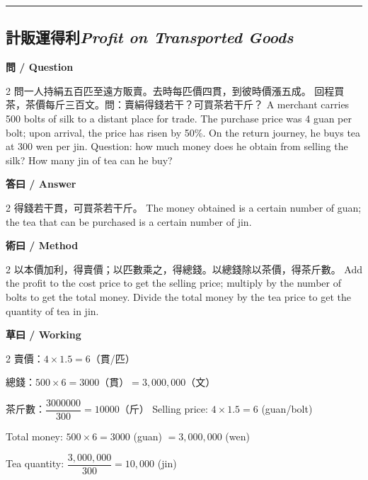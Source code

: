\documentclass[11pt,a4paper]{article}
\newcommand{\bilingualsubsection}[2]{\subsection{#1\quad\textit{#2}}}
\newcommand{\longline}{\noindent\rule{\textwidth}{0.4pt}}
\begin{document}
\vspace{0.5em}
\longline

\bilingualsubsection{計販運得利}{Profit on Transported Goods}

\vspace{0.4em}
\noindent\textbf{\textcolor{chinesecolor}{問} / \textcolor{englishcolor}{Question}}
\vspace{0.3em}
\begin{paracol}{2}
問一人持絹五百匹至遠方販賣。去時每匹價四貫，到彼時價漲五成。
回程買茶，茶價每斤三百文。問：賣絹得錢若干？可買茶若干斤？
\switchcolumn
A merchant carries 500 bolts of silk to a distant place for trade. The
purchase price was 4 guan per bolt; upon arrival, the price has risen by
50\%. On the return journey, he buys tea at 300 wen per jin. Question: how
much money does he obtain from selling the silk? How many jin of tea can he
buy?
\end{paracol}

\vspace{0.4em}
\noindent\textbf{\textcolor{chinesecolor}{答曰} / \textcolor{englishcolor}{Answer}}
\vspace{0.2em}
\begin{paracol}{2}
得錢若干貫，可買茶若干斤。
\switchcolumn
The money obtained is a certain number of guan; the tea that can be
purchased is a certain number of jin.
\end{paracol}

\vspace{0.4em}
\noindent\textbf{\textcolor{chinesecolor}{術曰} / \textcolor{englishcolor}{Method}}
\vspace{0.2em}
\begin{paracol}{2}
以本價加利，得賣價；以匹數乘之，得總錢。以總錢除以茶價，得茶斤數。
\switchcolumn
Add the profit to the cost price to get the selling price; multiply by the
number of bolts to get the total money. Divide the total money by the tea
price to get the quantity of tea in jin.
\end{paracol}

\vspace{0.4em}
\noindent\textbf{\textcolor{chinesecolor}{草曰} / \textcolor{englishcolor}{Working}}
\vspace{0.2em}
\begin{paracol}{2}
賣價：$4 \times 1.5 = 6$（貫/匹）

總錢：$500 \times 6 = 3000$（貫）$= 3{,}000{,}000$（文）

茶斤數：$\dfrac{3000000}{300} = 10000$（斤）
\switchcolumn
Selling price: $4 \times 1.5 = 6$ (guan/bolt)

Total money: $500 \times 6 = 3000$ (guan) $= 3{,}000{,}000$ (wen)

Tea quantity: $\dfrac{3{,}000{,}000}{300} = 10{,}000$ (jin)
\end{paracol}
\end{document}
